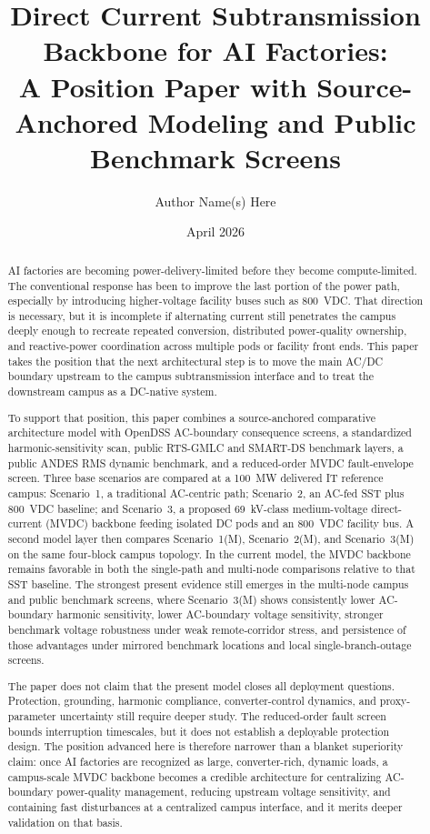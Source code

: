 \documentclass[11pt]{article}
\title{Direct Current Subtransmission Backbone for AI Factories:\\
A Position Paper with Source-Anchored Modeling and Public Benchmark Screens}
\author{Author Name(s) Here}
\date{April 2026}
\begin{document}
\maketitle

\begin{abstract}
AI factories are becoming power-delivery-limited before they become compute-limited. The conventional response has been to improve the last portion of the power path, especially by introducing higher-voltage facility buses such as 800~VDC. That direction is necessary, but it is incomplete if alternating current still penetrates the campus deeply enough to recreate repeated conversion, distributed power-quality ownership, and reactive-power coordination across multiple pods or facility front ends. This paper takes the position that the next architectural step is to move the main AC/DC boundary upstream to the campus subtransmission interface and to treat the downstream campus as a DC-native system.

To support that position, this paper combines a source-anchored comparative architecture model with OpenDSS AC-boundary consequence screens, a standardized harmonic-sensitivity scan, public RTS-GMLC and SMART-DS benchmark layers, a public ANDES RMS dynamic benchmark, and a reduced-order MVDC fault-envelope screen. Three base scenarios are compared at a 100~MW delivered IT reference campus: Scenario~1, a traditional AC-centric path; Scenario~2, an AC-fed SST plus 800~VDC baseline; and Scenario~3, a proposed 69~kV-class medium-voltage direct-current (MVDC) backbone feeding isolated DC pods and an 800~VDC facility bus. A second model layer then compares Scenario~1(M), Scenario~2(M), and Scenario~3(M) on the same four-block campus topology. In the current model, the MVDC backbone remains favorable in both the single-path and multi-node comparisons relative to that SST baseline. The strongest present evidence still emerges in the multi-node campus and public benchmark screens, where Scenario~3(M) shows consistently lower AC-boundary harmonic sensitivity, lower AC-boundary voltage sensitivity, stronger benchmark voltage robustness under weak remote-corridor stress, and persistence of those advantages under mirrored benchmark locations and local single-branch-outage screens.

The paper does not claim that the present model closes all deployment questions. Protection, grounding, harmonic compliance, converter-control dynamics, and proxy-parameter uncertainty still require deeper study. The reduced-order fault screen bounds interruption timescales, but it does not establish a deployable protection design. The position advanced here is therefore narrower than a blanket superiority claim: once AI factories are recognized as large, converter-rich, dynamic loads, a campus-scale MVDC backbone becomes a credible architecture for centralizing AC-boundary power-quality management, reducing upstream voltage sensitivity, and containing fast disturbances at a centralized campus interface, and it merits deeper validation on that basis.
\end{abstract}
\end{document}
